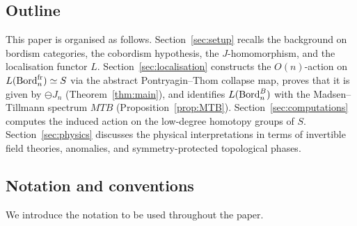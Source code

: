 \documentclass{amsart}
\begin{document}
\subsection*{Outline}

This paper is organised as follows.
Section~\ref{sec:setup} recalls the background on bordism categories, the cobordism hypothesis, the $J$-homomorphism, and the localisation functor $L$.
Section~\ref{sec:localisation} constructs the $O(n)$-action on $L(\operatorname{Bord}_n^{\mathrm{fr}}) \simeq S$ via the abstract Pontryagin--Thom collapse map, proves that it is given by $\ominus J_n$ (Theorem~\ref{thm:main}), and identifies $L(\operatorname{Bord}_n^B)$ with the Madsen--Tillmann spectrum $MTB$ (Proposition~\ref{prop:MTB}).
Section~\ref{sec:computations} computes the induced action on the low-degree homotopy groups of $S$.
Section~\ref{sec:physics} discusses the physical interpretations in terms of invertible field theories, anomalies, and symmetry-protected topological phases.
\subsection*{Notation and conventions}

We introduce the notation to be used throughout the paper.
\end{document}
